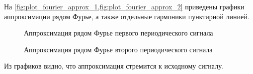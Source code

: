 На \cref{fig:plot_fourier_approx_1,fig:plot_fourier_approx_2} приведены графики аппроксимации рядом Фурье, а также отдельные гармоники пунктирной линией.

\begin{figure}[H]
    \centering
    
    \caption{Аппроксимация рядом Фурье первого периодического сигнала}
    \label{fig:plot_fourier_approx_1}
\end{figure}

\begin{figure}[H]
    \centering
    
    \caption{Аппроксимация рядом Фурье второго периодического сигнала}
    \label{fig:plot_fourier_approx_2}
\end{figure}

Из графиков видно, что аппроксимация стремится к исходному сигналу.